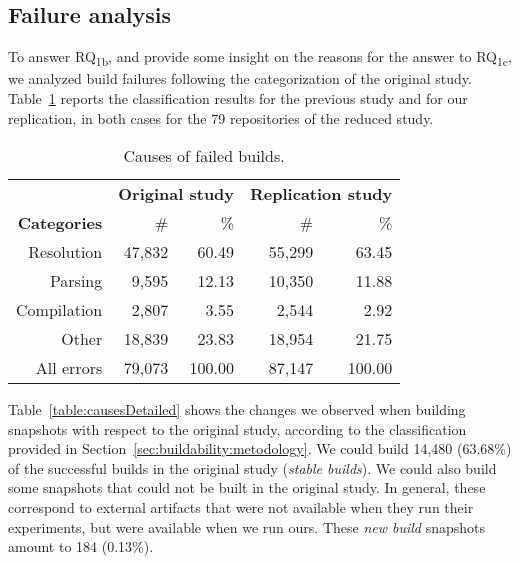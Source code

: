 \subsection{Failure analysis}

To answer RQ\textsubscript{1b}, and provide some insight on the reasons for the answer to RQ\textsubscript{1c}, we analyzed build failures following the categorization of the original study. Table~\ref{table:allCauses} reports the classification results for the previous study and for our replication, in both cases for the 79 repositories of the reduced study.

\begin{table}[h]
\caption{Causes of failed builds.}
\label{table:allCauses}
\begin{center}
\begin{tabular*}{\textwidth}{@{\extracolsep{\fill}}rrrrr}
\toprule
\multicolumn{1}{l}{}	    & \multicolumn{2}{c}{\bf{Original study}}    & \multicolumn{2}{c}{\bf{Replication study}}  \\
\bf{Categories}                 & \multicolumn{1}{r}{\#} & \multicolumn{1}{r}{\%} & \multicolumn{1}{r}{\#} & \multicolumn{1}{r}{\%}  \\
\midrule
Resolution  & 47,832 &  60.49 & 55,299 & 63.45  \\
Parsing     &  9,595 &  12.13 & 10,350 & 11.88  \\
Compilation &  2,807 &   3.55 &  2,544 &  2.92  \\
Other       & 18,839 &  23.83 & 18,954 & 21.75  \\
\midrule
All errors & 79,073 & 100.00 & 87,147 & 100.00 \\
\bottomrule
\end{tabular*}
\end{center}
\end{table}

Table~\ref{table:causesDetailed} shows the changes we observed when building snapshots with respect to the original study, according to the classification provided in Section~\ref{sec:buildability:metodology}. We could build 14,480 (63.68\%) of the successful builds in the original study (\textit{stable builds}). We could also build some snapshots that could not be built in the original study. In general, these correspond to external artifacts that were not available when they run their experiments, but were available when we run ours. These \emph{new build} snapshots amount to 184 (0.13\%).

